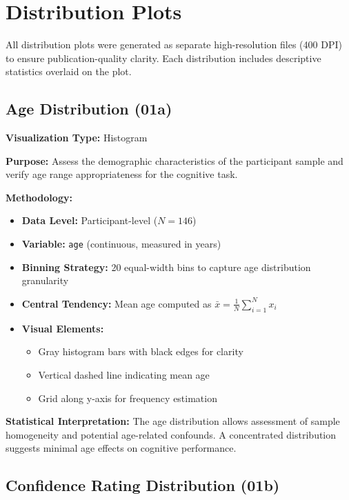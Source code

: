 \documentclass[12pt,a4paper]{article}
\begin{document}
\newpage
\section{Distribution Plots}

All distribution plots were generated as separate high-resolution files (400 DPI) to ensure publication-quality clarity. Each distribution includes descriptive statistics overlaid on the plot.

\subsection{Age Distribution (01a)}

\textbf{Visualization Type:} Histogram

\textbf{Purpose:} Assess the demographic characteristics of the participant sample and verify age range appropriateness for the cognitive task.

\textbf{Methodology:}
\begin{itemize}
    \item \textbf{Data Level:} Participant-level ($N=146$)
    \item \textbf{Variable:} \texttt{age} (continuous, measured in years)
    \item \textbf{Binning Strategy:} 20 equal-width bins to capture age distribution granularity
    \item \textbf{Central Tendency:} Mean age computed as $\bar{x} = \frac{1}{N}\sum_{i=1}^{N} x_i$
    \item \textbf{Visual Elements:}
        \begin{itemize}
            \item Gray histogram bars with black edges for clarity
            \item Vertical dashed line indicating mean age
            \item Grid along y-axis for frequency estimation
        \end{itemize}
\end{itemize}

\textbf{Statistical Interpretation:} The age distribution allows assessment of sample homogeneity and potential age-related confounds. A concentrated distribution suggests minimal age effects on cognitive performance.

\subsection{Confidence Rating Distribution (01b)}
\end{document}

